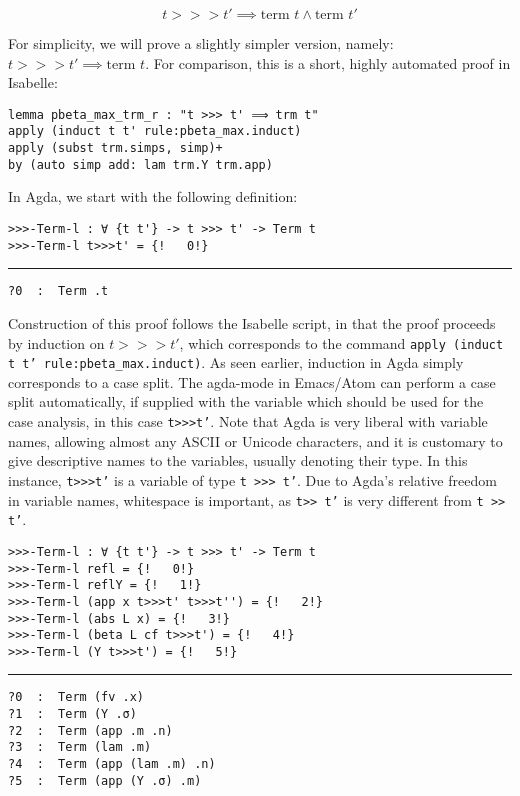 \documentclass[a4paper, 12pt, twoside]{style/ociamthesis}
\theoremstyle{plain}
\theoremstyle{definition}
\theoremstyle{remark}
\begin{document}
\[t >>> t' \implies \text{term }t \land \text{term }t'\]

For simplicity, we will prove a slightly simpler version, namely:
\(t >>> t' \implies \text{term }t\). For comparison, this is a short,
highly automated proof in Isabelle:

\begin{verbatim}
lemma pbeta_max_trm_r : "t >>> t' ⟹ trm t"
apply (induct t t' rule:pbeta_max.induct)
apply (subst trm.simps, simp)+
by (auto simp add: lam trm.Y trm.app)
\end{verbatim}

In Agda, we start with the following definition:

\begin{verbatim}
>>>-Term-l : ∀ {t t'} -> t >>> t' -> Term t
>>>-Term-l t>>>t' = {!   0!}
\end{verbatim}

\noindent\rule{8cm}{0.4pt}

\begin{verbatim}
?0  :  Term .t
\end{verbatim}

Construction of this proof follows the Isabelle script, in that the
proof proceeds by induction on \(t >>> t'\), which corresponds to the
command \texttt{apply (induct t t' rule:pbeta\_max.induct)}. As seen
earlier, induction in Agda simply corresponds to a case split. The
agda-mode in Emacs/Atom can perform a case split automatically, if
supplied with the variable which should be used for the case analysis,
in this case \texttt{t>>>t'}. Note that Agda is very liberal with
variable names, allowing almost any ASCII or Unicode characters, and it
is customary to give descriptive names to the variables, usually
denoting their type. In this instance, \texttt{t>>>t'} is a variable of
type \texttt{t >>> t'}. Due to Agda's relative freedom in variable
names, whitespace is important, as \texttt{t>> t'} is very different
from \texttt{t >> t'}.

\begin{verbatim}
>>>-Term-l : ∀ {t t'} -> t >>> t' -> Term t
>>>-Term-l refl = {!   0!}
>>>-Term-l reflY = {!   1!}
>>>-Term-l (app x t>>>t' t>>>t'') = {!   2!}
>>>-Term-l (abs L x) = {!   3!}
>>>-Term-l (beta L cf t>>>t') = {!   4!}
>>>-Term-l (Y t>>>t') = {!   5!}
\end{verbatim}

\noindent\rule{8cm}{0.4pt}

\begin{verbatim}
?0  :  Term (fv .x)
?1  :  Term (Y .σ)
?2  :  Term (app .m .n)
?3  :  Term (lam .m)
?4  :  Term (app (lam .m) .n)
?5  :  Term (app (Y .σ) .m)
\end{verbatim}
\end{document}
